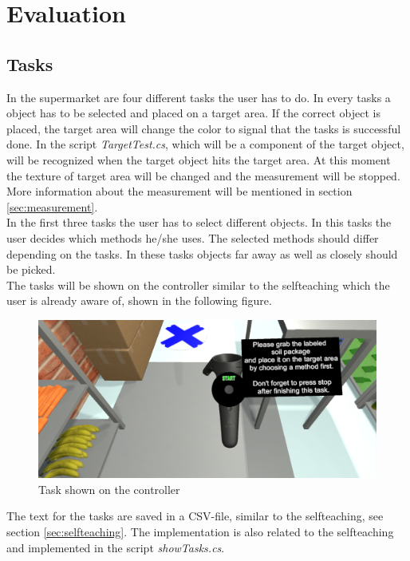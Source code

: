 \section{Evaluation} \label{sec:evaluation}

\subsection{Tasks} \label{sec:tasks}
In the supermarket are four different tasks the user has to do. In every tasks a object has to be selected and placed on a target area. If the correct object is placed, the target area will change the color to signal that the tasks is successful done. In the script \textit{TargetTest.cs}, which will be a component of the target object, will be recognized when the target object hits the target area. At this moment the texture of target area will be changed and the measurement will be stopped. More information about the measurement will be mentioned in section \ref{sec:measurement}.\\
In the first three tasks the user has to select different objects. In this tasks the user decides which methods he/she uses. The selected methods should differ depending on the tasks. In these tasks objects far away as well as closely should be picked. \\
The tasks will be shown on the controller similar to the selfteaching which the user is already aware of, shown in the following figure. 

\begin{figure}[H] 
	\center 
	\includegraphics[width=12cm]{Images/TaskContreoller.PNG}
	\caption[Task shown on the controller]{Task shown on the controller}
	\label{fig:taskC}
\end{figure} 

The text for the tasks are saved in a CSV-file, similar to the selfteaching, see section \ref{sec:selfteaching}. The implementation is also related to the selfteaching and implemented in the script \textit{showTasks.cs}.

